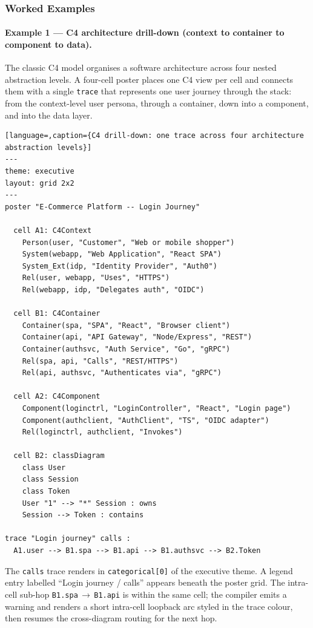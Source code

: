 \subsubsection{Worked Examples}
\label{sec:cdl-trace-examples}

\paragraph{Example 1 --- C4 architecture drill-down (context to container to component to data).}

The classic C4 model organises a software architecture across four nested
abstraction levels.  A four-cell poster places one C4 view per cell and
connects them with a single \texttt{trace} that represents one user journey
through the stack: from the context-level user persona, through a container,
down into a component, and into the data layer.

\begin{lstlisting}[language=,caption={C4 drill-down: one trace across four architecture abstraction levels}]
---
theme: executive
layout: grid 2x2
---
poster "E-Commerce Platform -- Login Journey"

  cell A1: C4Context
    Person(user, "Customer", "Web or mobile shopper")
    System(webapp, "Web Application", "React SPA")
    System_Ext(idp, "Identity Provider", "Auth0")
    Rel(user, webapp, "Uses", "HTTPS")
    Rel(webapp, idp, "Delegates auth", "OIDC")

  cell B1: C4Container
    Container(spa, "SPA", "React", "Browser client")
    Container(api, "API Gateway", "Node/Express", "REST")
    Container(authsvc, "Auth Service", "Go", "gRPC")
    Rel(spa, api, "Calls", "REST/HTTPS")
    Rel(api, authsvc, "Authenticates via", "gRPC")

  cell A2: C4Component
    Component(loginctrl, "LoginController", "React", "Login page")
    Component(authclient, "AuthClient", "TS", "OIDC adapter")
    Rel(loginctrl, authclient, "Invokes")

  cell B2: classDiagram
    class User
    class Session
    class Token
    User "1" --> "*" Session : owns
    Session --> Token : contains

trace "Login journey" calls :
  A1.user --> B1.spa --> B1.api --> B1.authsvc --> B2.Token
\end{lstlisting}

The \texttt{calls} trace renders in \texttt{categorical[0]} of the executive
theme.  A legend entry labelled ``Login journey / calls'' appears beneath the
poster grid.  The intra-cell sub-hop \texttt{B1.spa}\,$\to$\,\texttt{B1.api}
is within the same cell; the compiler emits a warning and renders a short
intra-cell loopback arc styled in the trace colour, then resumes the
cross-diagram routing for the next hop.

